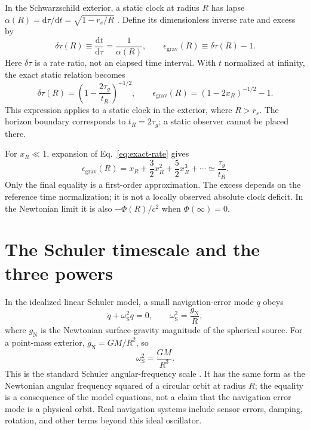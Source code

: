 \documentclass[12pt]{article}
\begin{document}
In the Schwarzschild exterior, a static clock at radius $R$ has lapse $\alpha(R)=\mathrm{d}\tau/\mathrm{d}t=\sqrt{1-r_s/R}$ \cite{Schwarzschild}. Define its dimensionless inverse rate and excess by
\begin{equation}
  \delta\tau(R)\equiv\frac{\mathrm{d}t}{\mathrm{d}\tau}
  =\frac{1}{\alpha(R)},
  \qquad
  \epsilon_{\mathrm{grav}}(R)\equiv\delta\tau(R)-1.
  \label{eq:inverse-rate}
\end{equation}
Here $\delta\tau$ is a rate ratio, not an elapsed time interval. With $t$ normalized at infinity, the exact static relation becomes
\begin{equation}
  \delta\tau(R)
  =\left(1-\frac{2\tau_g}{t_R}\right)^{-1/2},
  \qquad
  \epsilon_{\mathrm{grav}}(R)
  =\left(1-2x_R\right)^{-1/2}-1.
  \label{eq:exact-rate}
\end{equation}
This expression applies to a static clock in the exterior, where $R>r_s$. The horizon boundary corresponds to $t_R=2\tau_g$; a static observer cannot be placed there.

For $x_R\ll1$, expansion of Eq.~\eqref{eq:exact-rate} gives
\begin{equation}
  \epsilon_{\mathrm{grav}}(R)
  =x_R+\frac{3}{2}x_R^2+\frac{5}{2}x_R^3+\cdots
  \simeq\frac{\tau_g}{t_R}.
  \label{eq:weak-rate}
\end{equation}
Only the final equality is a first-order approximation. The excess depends on the reference time normalization; it is not a locally observed absolute clock deficit. In the Newtonian limit it is also $-\Phi(R)/c^2$ when $\Phi(\infty)=0$.

\section{The Schuler timescale and the three powers}

In the idealized linear Schuler model, a small navigation-error mode $q$ obeys
\begin{equation}
  \ddot q+\omega_{\mathrm{S}}^2q=0,
  \qquad
  \omega_{\mathrm{S}}^2=\frac{g_{\mathrm{N}}}{R},
  \label{eq:schuler-mode}
\end{equation}
where $g_{\mathrm{N}}$ is the Newtonian surface-gravity magnitude of the spherical source. For a point-mass exterior, $g_{\mathrm{N}}=GM/R^2$, so
\begin{equation}
  \omega_{\mathrm{S}}^2=\frac{GM}{R^3}.
  \label{eq:schuler-kepler}
\end{equation}
This is the standard Schuler angular-frequency scale \cite{Schuler1923,WhittakerCrassidis}. It has the same form as the Newtonian angular frequency squared of a circular orbit at radius $R$; the equality is a consequence of the model equations, not a claim that the navigation error mode is a physical orbit. Real navigation systems include sensor errors, damping, rotation, and other terms beyond this ideal oscillator.
\end{document}

